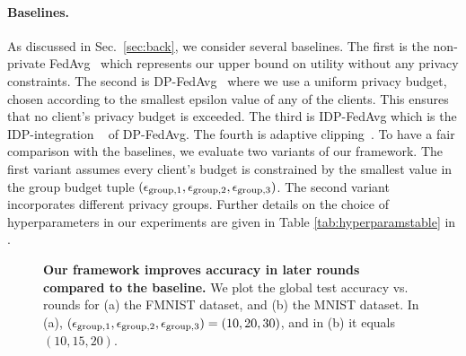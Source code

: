 \paragraph{Baselines.} As discussed in Sec.~\ref{sec:back}, we consider several baselines. %
{The first is the non-private FedAvg~\citep{mcmahan2017communication} which represents our upper bound on utility without any privacy constraints.} The second is DP-FedAvg~\citep{mcmahan2017learning} where we use a uniform privacy budget, chosen according to the smallest epsilon value of any of the clients. This ensures that no client's privacy budget is exceeded. The third is IDP-FedAvg which is the IDP-integration ~\citep{boenisch2024have} of DP-FedAvg. %
{The fourth is adaptive clipping~\citep{andrew2021differentially}}. To have a fair comparison with the baselines, we evaluate two variants of our framework. The first variant assumes every client's budget is constrained by the smallest value in the group budget tuple $({\epsilon}_{\text{group},1}, {\epsilon}_{\text{group},2}, {\epsilon}_{\text{group},3})$. The second variant incorporates different privacy groups. Further details on the choice of hyperparameters in our experiments are given in Table \ref{tab:hyperparamstable} in  . 

\begin{figure}[h]
    \centering
    \caption{\textbf{Our framework improves accuracy in later rounds compared to the baseline.} We plot the global test accuracy vs. rounds for (a) the FMNIST dataset, and (b) the MNIST dataset. In (a), $({\epsilon}_{\text{group},1}, {\epsilon}_{\text{group},2}, {\epsilon}_{\text{group},3})=(10,20,30)$, and in (b) it equals $(10,15,20)$.} 
    \label{fig:results}
    \centering \vspace{-1ex}
\end{figure}


